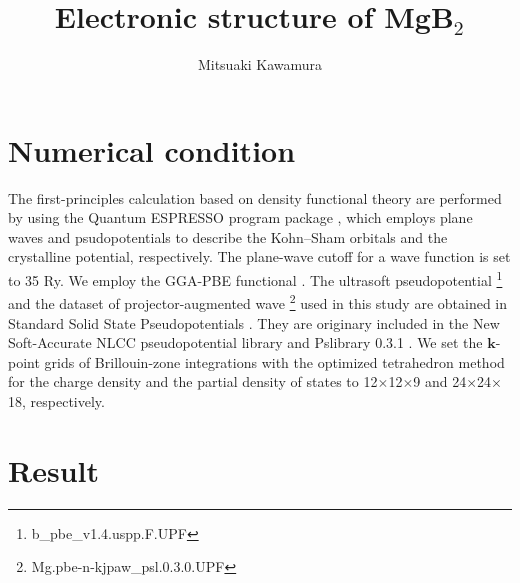 \documentclass[twocolumn,11pt]{article}
\begin{document}
\title{Electronic structure of MgB$_2$}
\author{Mitsuaki Kawamura}
\maketitle


\section{Numerical condition}

The first-principles calculation based on density functional theory are performed
by using the Quantum ESPRESSO program package \cite{0953-8984-29-46-465901},
which employs plane waves and psudopotentials to describe the Kohn--Sham orbitals and the crystalline potential, respectively.
The plane-wave cutoff for a wave function is set to 35 Ry.
We employ the GGA-PBE functional \cite{PhysRevLett.78.1396}.
The ultrasoft pseudopotential \cite{PhysRevB.41.7892} \footnote{b\_pbe\_v1.4.uspp.F.UPF}
and the dataset of projector-augmented wave \cite{PhysRevB.50.17953} \footnote{Mg.pbe-n-kjpaw\_psl.0.3.0.UPF}
used in this study are obtained in Standard Solid State Pseudopotentials \cite{Prandini2018}.
They are originary included in the New Soft-Accurate NLCC pseudopotential library \cite{GARRITY2014446}
and Pslibrary 0.3.1 \cite{kucukbenli2014projector}. 
We set the ${\boldsymbol k}$-point grids of Brillouin-zone integrations with the optimized tetrahedron method \cite{PhysRevB.89.094515}
for the charge density and the partial density of states to 12$\times$12$\times$9 and 24$\times$24$\times$18, respectively.

\section{Result}
\end{document}
